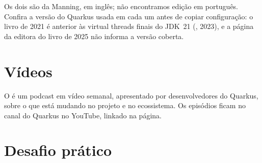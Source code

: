 Os dois são da Manning, em inglês; não encontramos edição em português.
Confira a versão do Quarkus usada em cada um antes de copiar
configuração: o livro de 2021 é anterior às virtual threads finais do
JDK~21 (, 2023), e a página da editora do livro de 2025 não
informa a versão coberta.

\section{Vídeos}

O  é um podcast em vídeo semanal,
apresentado por desenvolvedores do Quarkus, sobre o que está mudando no
projeto e no ecossistema. Os episódios ficam no canal do Quarkus no
YouTube, linkado na página.

\section{Desafio prático}

